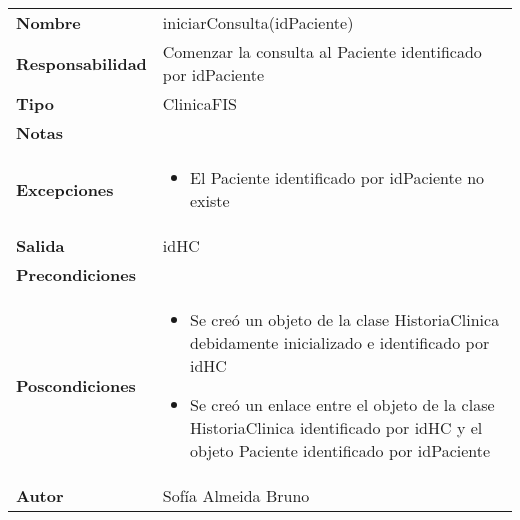 \documentclass[11pt,a4paper]{article}
\begin{document}
\begin{table}[H]
\centering
\label{my-label}
\begin{tabularx}{\textwidth}{l|X}
\textbf{Nombre}          & iniciarConsulta(idPaciente) \\
\textbf{Responsabilidad} & Comenzar la consulta al Paciente identificado por idPaciente\\
\textbf{Tipo}            & ClinicaFIS \\
\textbf{Notas}           &  \\
\textbf{Excepciones}     & 
\begin{itemize}
\item El Paciente identificado por idPaciente no existe
\end{itemize}\\
\textbf{Salida}          &  idHC\\
\textbf{Precondiciones}  &  \\
\textbf{Poscondiciones}  &
\begin{itemize}
\item Se creó un objeto de la clase HistoriaClinica debidamente inicializado e identificado por idHC
\item Se creó un enlace entre el objeto de la clase HistoriaClinica identificado por idHC y el objeto Paciente identificado por idPaciente
\end{itemize}\\
\textbf{Autor}           & Sofía Almeida Bruno
\end{tabularx}
\end{table}
\end{document}
